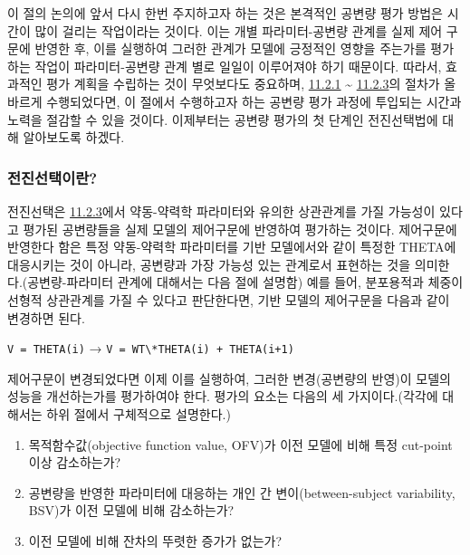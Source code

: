 \documentclass[
  10pt,
  krantz2,
  a4paper]{krantz}
\providecommand{\tightlist}{%
  \setlength{\itemsep}{0pt}\setlength{\parskip}{0pt}}
\theoremstyle{definition}
\theoremstyle{definition}
\theoremstyle{definition}
\theoremstyle{remark}
\begin{document}
이 절의 논의에 앞서 다시 한번 주지하고자 하는 것은 본격적인 공변량 평가 방법은 시간이 많이 걸리는 작업이라는 것이다. 이는 개별 파라미터-공변량 관계를 실제 제어 구문에 반영한 후, 이를 실행하여 그러한 관계가 모델에 긍정적인 영향을 주는가를 평가하는 작업이 파라미터-공변량 관계 별로 일일이 이루어져야 하기 때문이다. 따라서, 효과적인 평가 계획을 수립하는 것이 무엇보다도 중요하며, \protect\hyperlink{variable-eval}{11.2.1} \textasciitilde{} \protect\hyperlink{colinearity}{11.2.3}의 절차가 올바르게 수행되었다면, 이 절에서 수행하고자 하는 공변량 평가 과정에 투입되는 시간과 노력을 절감할 수 있을 것이다. 이제부터는 공변량 평가의 첫 단계인 전진선택법에 대해 알아보도록 하겠다.

\hypertarget{forward-sel-def}{%
\subsubsection{전진선택이란?}\label{forward-sel-def}}

전진선택은 \protect\hyperlink{colinearity}{11.2.3}에서 약동-약력학 파라미터와 유의한 상관관계를 가질 가능성이 있다고 평가된 공변량들을 실제 모델의 제어구문에 반영하여 평가하는 것이다. 제어구문에 반영한다 함은 특정 약동-약력학 파라미터를 기반 모델에서와 같이 특정한 THETA에 대응시키는 것이 아니라, 공변량과 가장 가능성 있는 관계로서 표현하는 것을 의미한다.(공변량-파라미터 관계에 대해서는 다음 절에 설명함) 예를 들어, 분포용적과 체중이 선형적 상관관계를 가질 수 있다고 판단한다면, 기반 모델의 제어구문을 다음과 같이 변경하면 된다.

\texttt{V\ =\ THETA(i)} → \texttt{V\ =\ WT\textbackslash{}*THETA(i)\ +\ THETA(i+1)}

제어구문이 변경되었다면 이제 이를 실행하여, 그러한 변경(공변량의 반영)이 모델의 성능을 개선하는가를 평가하여야 한다. 평가의 요소는 다음의 세 가지이다.(각각에 대해서는 하위 절에서 구체적으로 설명한다.)

\begin{enumerate}
\def\labelenumi{\arabic{enumi}.}
\tightlist
\item
  목적함수값(objective function value, OFV)가 이전 모델에 비해 특정 cut-point 이상 감소하는가?
\item
  공변량을 반영한 파라미터에 대응하는 개인 간 변이(between-subject variability, BSV)가 이전 모델에 비해 감소하는가?
\item
  이전 모델에 비해 잔차의 뚜렷한 증가가 없는가?
\end{enumerate}
\end{document}
